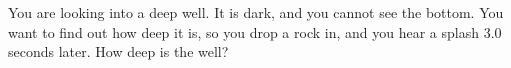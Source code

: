  You are looking into a deep well. It is dark, and you
cannot see the bottom. You want to find out how deep it is,
so you drop a rock in, and you hear a splash 3.0 seconds
later. How deep is the well? \answercheck
